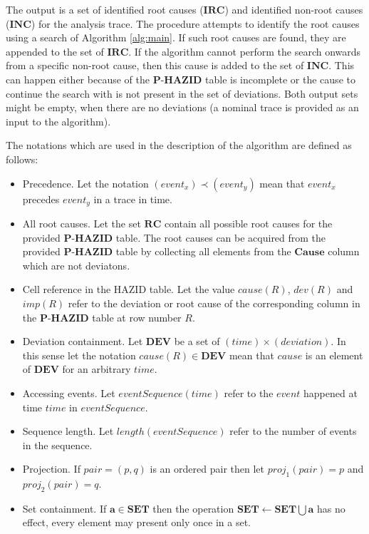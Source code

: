 \documentclass[conference]{IEEEtran}
\begin{document}
The output is a set of identified root causes ($\mathbf{IRC}$) and identified non-root causes ($\mathbf{INC}$) for the analysis trace. The procedure attempts to identify the root causes using a search of Algorithm \ref{alg:main}. If such root causes are found, they are appended to the set of $\mathbf{IRC}$. If the algorithm cannot perform the search onwards from a specific non-root cause, then this cause is added to the set of $\mathbf{INC}$. This can happen either because of the $\textbf{P-HAZID}$ table is incomplete or the cause to continue the search with is not present in the set of deviations. Both output sets might be empty, when there are no deviations (a nominal trace is provided as an input to the algorithm).

The notations which are used in the description of the algorithm are defined as follows:

\begin{itemize}
\item Precedence. Let the notation $(event_x) \prec (event_y)$ mean that $event_x$ precedes $event_y$ in a trace in time.
\item All root causes. Let the set $\mathbf{RC}$ contain all possible root causes for the provided $\textbf{P-HAZID}$ table. The root causes can be acquired from the provided $\textbf{P-HAZID}$ table by collecting all elements from the $\mathbf{Cause}$ column which are not deviatons.
\item Cell reference in the HAZID table. Let the value $cause(R)$, $dev(R)$ and $imp(R)$ refer to the deviation or root cause of the corresponding column
in the $\textbf{P-HAZID}$ table at row number $R$.
\item Deviation containment. Let $\mathbf{DEV}$ be a set of $(time)\times(deviation)$. In this sense let the notation $cause(R) \in \mathbf{DEV}$ mean that $cause$ is an element of $\mathbf{DEV}$ for an arbitrary $time$.
\item Accessing events. Let $eventSequence(time)$ refer to the $event$ happened at time $time$ in $eventSequence$.
\item Sequence length. Let $length(eventSequence)$ refer to the number of events in the sequence.
\item Projection. If $pair = (p,q)$ is an ordered pair then let $proj_1(pair)=p$ and $proj_2(pair)=q$.
\item Set containment. If $\mathbf{a} \in \mathbf{SET}$ then the operation $\mathbf{SET} \leftarrow \mathbf{SET} \bigcup \mathbf{a}$ has no effect, every element may present only once in a set.
\end{itemize}
\end{document}

